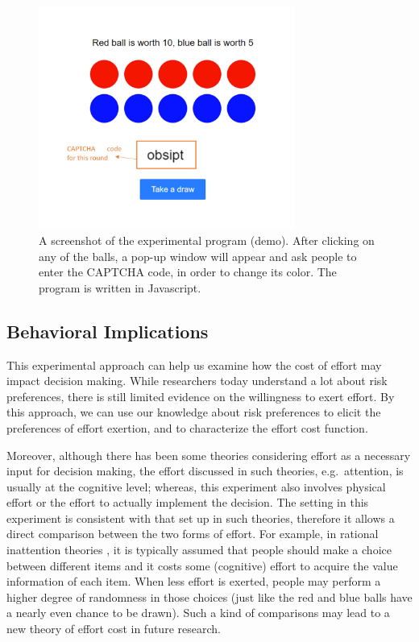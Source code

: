 \documentclass[
  12pt,
]{article}
\begin{document}
\begin{figure}[h]
  \centering
  \includegraphics[width=0.75\textwidth]{images/screenshot-demo.png}
  \caption{A screenshot of the experimental program (demo). After clicking on any of the balls, a pop-up window will appear and ask people to enter the CAPTCHA code, in order to change its color. The program is written in Javascript.}
  \label{fig:demo}
\end{figure}

\hypertarget{behavioral-implications-1}{%
\subsection{Behavioral Implications}\label{behavioral-implications-1}}

This experimental approach can help us examine how the cost of effort
may impact decision making. While researchers today understand a lot
about risk preferences, there is still limited evidence on the
willingness to exert effort. By this approach, we can use our knowledge
about risk preferences to elicit the preferences of effort exertion, and
to characterize the effort cost function.

Moreover, although there has been some theories considering effort as a
necessary input for decision making, the effort discussed in such
theories, e.g.~attention, is usually at the cognitive level; whereas,
this experiment also involves physical effort or the effort to actually
implement the decision. The setting in this experiment is consistent
with that set up in such theories, therefore it allows a direct
comparison between the two forms of effort. For example, in rational
inattention theories \citep{matejka_rational_2015}, it is typically
assumed that people should make a choice between different items and it
costs some (cognitive) effort to acquire the value information of each
item. When less effort is exerted, people may perform a higher degree of
randomness in those choices (just like the red and blue balls have a
nearly even chance to be drawn). Such a kind of comparisons may lead to
a new theory of effort cost in future research.
\end{document}
